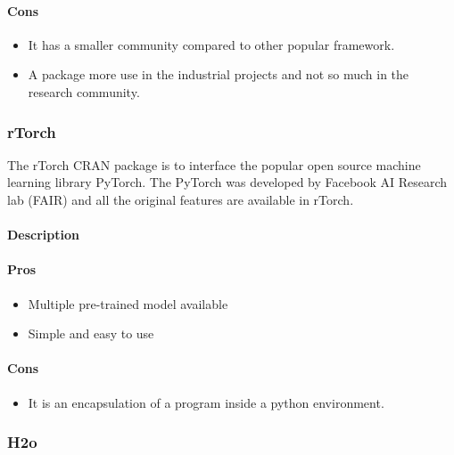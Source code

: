 \documentclass[6pt,letter]{article}\usepackage[]{graphicx}\usepackage[]{color}
\begin{document}
\paragraph{Cons}
\begin{itemize}
\item It has a smaller community compared to other popular framework.
\item A package more use in the industrial projects and not so much in the research community.
\end{itemize}


\subsubsection{rTorch}
The rTorch CRAN package is to interface the popular open source machine learning library PyTorch\cite{rTorch2019}. The PyTorch was developed by Facebook AI Research lab (FAIR) and all the original features are available in rTorch.

\paragraph{Description}
\paragraph{Pros}
\begin{itemize}
\item Multiple pre-trained model available 
\item Simple and easy to use 
\end{itemize}
\paragraph{Cons}
\begin{itemize}
\item It is an encapsulation of a program inside a python environment.
\end{itemize}
\subsubsection{H2o}
\end{document}
